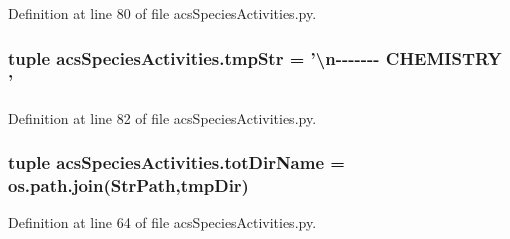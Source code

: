 Definition at line 80 of file acs\-Species\-Activities.\-py.

\hypertarget{a00097_a81ab8133517c53adfcdf8129e24cf5d0}{
\subsubsection[{tmp\-Str}]{\setlength{\rightskip}{0pt plus 5cm}tuple acs\-Species\-Activities.\-tmp\-Str = '\textbackslash{}n-\/-\/-\/-\/-\/-\/-\/ C\-H\-E\-M\-I\-S\-T\-R\-Y '}}\label{a00097_a81ab8133517c53adfcdf8129e24cf5d0}


Definition at line 82 of file acs\-Species\-Activities.\-py.

\hypertarget{a00097_aa71c948cf1d0699207eafcd30beb394e}{
\subsubsection[{tot\-Dir\-Name}]{\setlength{\rightskip}{0pt plus 5cm}tuple acs\-Species\-Activities.\-tot\-Dir\-Name = os.\-path.\-join({\bf Str\-Path},tmp\-Dir)}}\label{a00097_aa71c948cf1d0699207eafcd30beb394e}


Definition at line 64 of file acs\-Species\-Activities.\-py.

